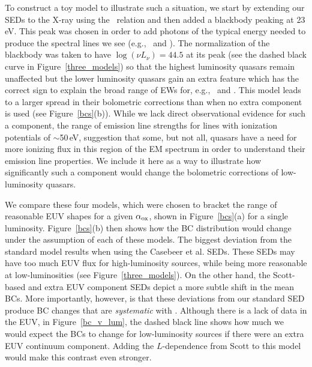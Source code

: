 To construct a toy model to illustrate such a situation, we start by extending our SEDs to the X-ray using the \citet{Steffen:2006} \luvaox\ relation and then added a blackbody peaking at 23 eV. 
This peak was chosen in order to add photons of the typical energy needed to produce the spectral lines we see (e.g., \civ\ and ).
 The normalization of the blackbody was taken to have $\log{(\nu L_{\nu})}=44.5$ at its peak (see the dashed black curve in Figure~\ref{three_models})  
so that the highest luminosity quasars remain unaffected but the lower luminosity quasars gain an extra feature which has the correct sign to explain the broad range of EWs for, e.g., \civ\ and 
\citep{Richards:2011}.  This model leads to a 
larger spread in their bolometric corrections than 
when no extra component is used (see Figure~\ref{bcs}(b)).  While we lack direct observational evidence for such a component,
the range of emission line strengths for lines with ionization potentials of $\sim$50\,eV, suggestion that some, but not all, quasars have a need for more ionizing flux in this region of the EM spectrum in order to understand their emission line properties.  We include it here as a way to illustrate how significantly such a component would change the bolometric corrections of low-luminosity quasars.  

We compare these four models, which were chosen to bracket the range of reasonable EUV shapes for a given $\alpha_{\rm ox}$, shown in Figure~\ref{bcs}(a) for a single luminosity.   Figure~\ref{bcs}(b)  then shows how the BC distribution would change under the assumption of each of these models.  The biggest deviation from the standard model results when using the Casebeer et al. SEDs. 
These SEDs may have too much EUV flux for high-luminosity sources, while being more reasonable at low-luminosities
(see Figure~\ref{three_models}).  On the other hand, the Scott-based and extra EUV component SEDs depict a more subtle shift in the mean BCs.  More importantly, however, is that these deviations from our standard SED produce BC changes that are {\em systematic} with \luv.    
Although there is a lack of data in the EUV, in Figure~\ref{bc_v_lum}, the dashed black line shows how much we would expect the BCs to change for low-luminosity sources if there were an extra EUV continuum component.  Adding the $L$-dependence from Scott to this model would make this contrast even stronger.  

